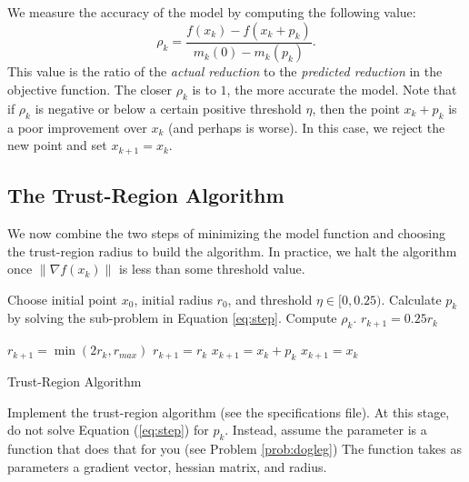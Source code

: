 We measure the accuracy of the model by computing the following value:
\[
\rho_k = \frac{f(x_k)-f(x_k+p_k)}{m_k(0) - m_k(p_k)}.
\]
This value is the ratio of the \emph{actual reduction} to the \emph{predicted reduction} in the objective function. The closer
$\rho_k$ is to $1$, the more accurate the model.
Note that if $\rho_k$ is negative or below a certain positive threshold $\eta$,
then the point $x_k+p_k$ is a poor improvement over $x_k$ (and perhaps is worse).
In this case, we reject the new point and set $x_{k+1} = x_k$.

\subsection*{The Trust-Region Algorithm}
We now combine the two steps of minimizing the model function and choosing the trust-region radius to build the algorithm.  In practice, we halt the algorithm once $\|\nabla f(x_k)\|$ is less than some threshold value.
\begin{algorithm}
\begin{algorithmic}[1]
    \State Choose initial point $x_0$, initial radius $r_0$, and threshold $\eta \in [0,0.25)$.
        \State Calculate $p_k$ by solving the sub-problem in Equation \ref{eq:step}.
        \State Compute $\rho_k$.
            \State $r_{k+1} = 0.25r_k$

        \Else
                \State $r_{k+1} = \min(2r_k, r_{max})$
            \Else
                \State $r_{k+1} = r_k$
            \EndIf
        \EndIf
            \State $x_{k+1} = x_k + p_k$
        \Else
            \State $x_{k+1} = x_k$
        \EndIf
    \EndWhile
\EndProcedure
\end{algorithmic}
\caption{Trust-Region Algorithm}
\label{alg:trustregion}
\end{algorithm}

\begin{problem}
Implement the trust-region algorithm (see the specifications file). %
At this stage, do not solve Equation (\ref{eq:step}) for $p_k$.
Instead, assume the parameter  is a function that does that for you (see Problem \ref{prob:dogleg})
The function  takes as parameters a gradient vector, hessian matrix, and radius.
\end{problem}

